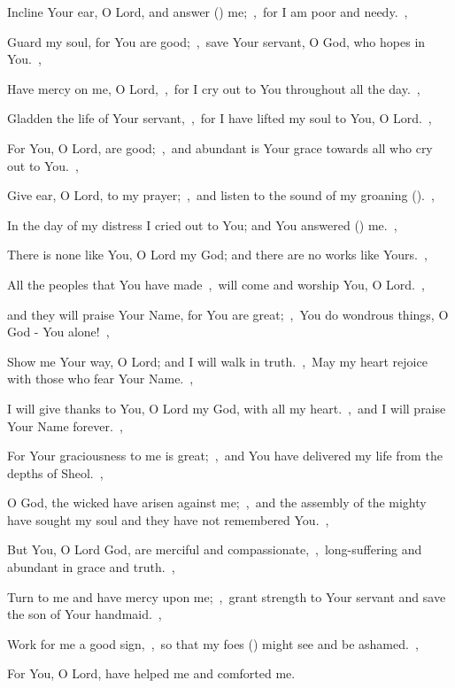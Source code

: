 \documentclass[12pt,twoside,a5paper]{article}
\begin{document}
\begin{normalparskip}
  Incline Your ear, O Lord, and answer () me;~\sep\ for I am poor and needy.~\sep


  Guard my soul, for You are good;~\sep\ save Your servant, O God, who hopes in You.~\sep

  Have mercy on me, O Lord,~\sep\ for I cry out to You throughout all the day.~\sep

  Gladden the life of Your servant,~\sep\ for I have lifted my soul to You, O Lord.~\sep

  For You, O Lord, are good;~\sep\ and abundant is Your grace towards all who cry out to You.~\sep

  Give ear, O Lord, to my prayer;~\sep\ and listen to the sound of my groaning ().~\sep

  In the day of my distress I cried out to You; and You answered () me.~\sep

  There is none like You, O Lord my God; and there are no works like Yours.~\sep

  All the peoples that You have made~\sep\ will come and worship You, O Lord.~\sep

  and they will praise Your Name, for You are great;~\sep\ You do wondrous things, O God - You alone!~\sep

  Show me Your way, O Lord; and I will walk in truth.~\sep\ May my heart rejoice with those who fear Your Name.~\sep

  I will give thanks to You, O Lord my God, with all my heart.~\sep\ and I will praise Your Name forever.~\sep

  For Your graciousness to me is great;~\sep\ and You have delivered my life from the depths of Sheol.~\sep

  O God, the wicked have arisen against me;~\sep\ and the assembly of the mighty have sought my soul and they have not remembered You.~\sep

  But You, O Lord God, are merciful and compassionate,~\sep\ long-suffering and abundant in grace and truth.~\sep

  Turn to me and have mercy upon me;~\sep\ grant strength to Your servant and save the son of Your handmaid.~\sep

  Work for me a good sign,~\sep\ so that my foes () might see and be ashamed.~\sep

  For You, O Lord, have helped me and comforted me.
\end{normalparskip}
\end{document}
